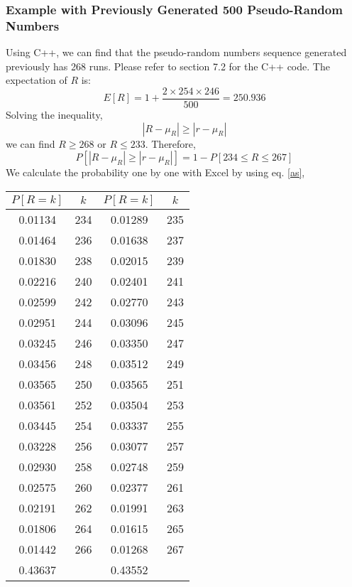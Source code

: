 \documentclass[a4paper,12pt]{article}
\begin{document}
\subsubsection{Example with Previously Generated 500 Pseudo-Random Numbers}
\noindent Using C++, we can find that the pseudo-random numbers sequence generated previously has 268 runs. Please refer to section 7.2 for the C++ code. The expectation of $R$ is: \\
\begin{equation*}
E[R]=1+\frac{2\times 254\times 246}{500}=250.936
\end{equation*}
Solving the inequality,
\begin{equation*}
|R-\mu _R|\geq |r-\mu_R|
\end{equation*}
we can find $R\geq 268$ or $R\leq 233$. Therefore,
\begin{equation*}
P[|R-\mu _R|\geq |r-\mu_R|]=1-P[234\leq R\leq 267]
\end{equation*}
We calculate the probability one by one with Excel by using eq. \eqref{as},
\begin{table}[H]\centering
\begin{tabular}{|c|c||c|c|}
\hline
$P[R=k]$ & $k$   & $P[R=k]$ & $k$   \\ \hline
0.01134               & 234 & 0.01289              & 235 \\ \hline
0.01464               & 236 & 0.01638              & 237 \\ \hline
0.01830               & 238 & 0.02015              & 239 \\ \hline
0.02216               & 240 & 0.02401              & 241 \\ \hline
0.02599               & 242 & 0.02770              & 243 \\ \hline
0.02951               & 244 & 0.03096              & 245 \\ \hline
0.03245               & 246 & 0.03350              & 247 \\ \hline
0.03456               & 248 & 0.03512              & 249 \\ \hline
0.03565               & 250 & 0.03565              & 251 \\ \hline
0.03561               & 252 & 0.03504              & 253 \\ \hline
0.03445               & 254 & 0.03337              & 255 \\ \hline
0.03228               & 256 & 0.03077              & 257 \\ \hline
0.02930               & 258 & 0.02748              & 259 \\ \hline
0.02575               & 260 & 0.02377              & 261 \\ \hline
0.02191               & 262 & 0.01991              & 263 \\ \hline
0.01806               & 264 & 0.01615              & 265 \\ \hline
0.01442               & 266 & 0.01268              & 267 \\ \hline
0.43637               &     & 0.43552              &     \\ \hline
\end{tabular}
\end{table}
\end{document}
